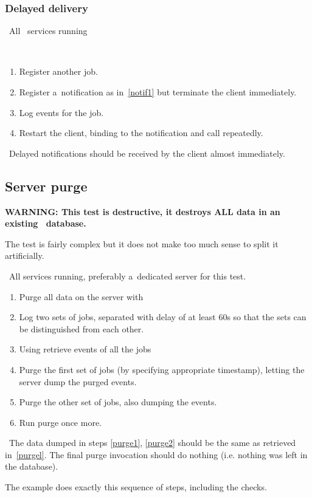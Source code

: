 
\subsubsection{Delayed delivery}

\req\ All \LB\ services running

\how\ 
\begin{enumerate}
\item Register another job.
\item Register a~notification as in~\ref{notif1} but terminate the client
immediately.
\item Log events for the job.
\item Restart the client, binding to the notification and call
 repeatedly.
\end{enumerate}

\result\ Delayed notifications should be received by the client almost
immediately.

\subsection{Server purge}

\textbf{WARNING: This test is destructive, it destroys ALL data in an
existing \LB\ database.} 

The test is fairly complex but it does not make too much sense to split it
artificially.

\req\ All \LB services running, preferably a~dedicated server for this test.

\how
\begin{enumerate}
\item Purge all data on the server with 
\item Log two sets of jobs, separated with delay of at least 60s so
that the sets can be distinguished from each other.
\item \label{purgel}
Using  retrieve events of all the jobs
\item \label{purge1}
Purge the first set of jobs (by specifying appropriate timestamp),
letting the server dump the purged events.
\item \label{purge2} Purge the other set of jobs, also dumping the events.
\item \label{purge3} Run purge once more.
\end{enumerate}

\result\ The data dumped in steps \ref{purge1}, \ref{purge2} should be the
same as retrieved in~\ref{purgel}. The final purge invocation should
do nothing (i.e. nothing was left in the database).

\begin{hints}
The example  does exactly this sequence of steps,
including the checks.
\end{hints}
